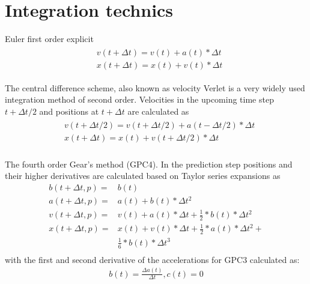 \section*{Integration technics}
Euler first order explicit
\begin{align}\label{eqn:euler}
    \begin{split}
        &v(t+\Delta{t}) = v(t) + a(t) * \Delta{t}\\
        &x(t+\Delta{t}) = x(t) + v(t) * \Delta{t}
    \end{split}
\end{align}
\par
The central difference scheme, also known as velocity Verlet is a very widely
used integration method of second order. Velocities in the upcoming time step $t
+ \Delta{t}/2 $ and positions at $t + \Delta{t}$ are calculated as
\begin{align}\label{eqn:verlet}
    \begin{split}
        &v(t + \Delta{t}/2) = v(t + \Delta{t}/2) +a(t - \Delta{t}/2) * \Delta{t}\\
        &x(t + \Delta{t}) = x(t) +v(t + \Delta{t}/2) * \Delta{t}\\
    \end{split}
\end{align}
\par
The fourth order Gear’s method (GPC4). In the prediction step positions and
their higher derivatives are calculated based on Taylor series expansions as
\begin{equation}\label{eqn:gearP}
    \begin{split}
        b(t+\Delta{t}, p) =& b(t)\\
        a(t+\Delta{t}, p) =& a(t) + b(t) *\Delta{t}^2\\
        v(t+\Delta{t}, p) =& v(t) + a(t) *\Delta{t} + \frac{1}{2} * b(t) *\Delta{t}^2\\
        x(t+\Delta{t}, p) =& x(t) + v(t) * \Delta{t} + \frac{1}{2} * a(t) *\Delta{t}^2 +\\
        &\frac{1}{6} * b(t) *\Delta{t}^3\\
    \end{split}
\end{equation}
with the first and second derivative of the accelerations for GPC3 calculated as:
\begin{align}\label{eqn:gearJerk3}
    b(t) = \frac{\Delta{a(t)}}{\Delta{t}}, c(t) = 0
\end{align}\par
